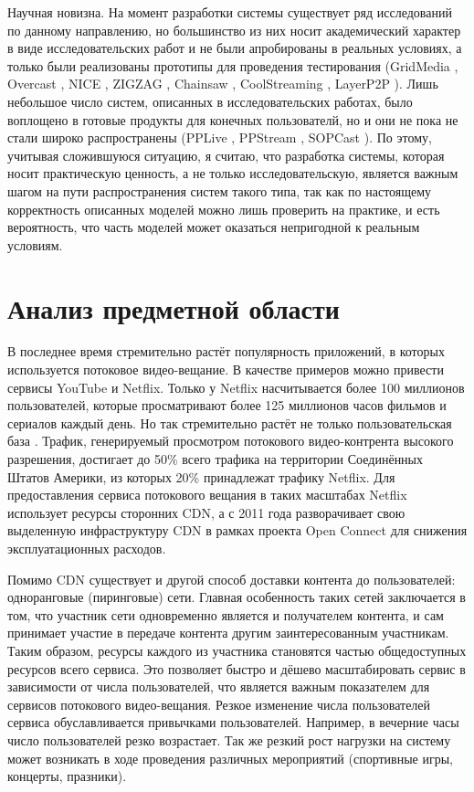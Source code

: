 	Научная новизна. На момент разработки системы существует ряд исследований по данному направлению, но
	большинство из них носит академический характер в виде исследовательских работ и не были апробированы в реальных
	условиях, а только были реализованы прототипы для проведения тестирования (GridMedia \cite{4013958}, Overcast
	\cite{1251243}, NICE \cite{633045}, ZIGZAG \cite{2314951}, Chainsaw \cite{2138975}, CoolStreaming \cite{878473483},
	LayerP2P \cite{5208239}). Лишь небольшое число систем, описанных в исследовательских работах, было воплощено в
	готовые продукты для конечных пользователй, но и они не пока не стали широко распространены (PPLive \cite{1403001},
	PPStream \cite{4685232}, SOPCast \cite{4346415}). По этому, учитывая сложившуюся ситуацию, я
	считаю, что разработка системы, которая носит практическую ценность, а не только исследовательскую, является важным
	шагом на пути распространения систем такого типа, так как по настоящему корректность описанных моделей можно лишь
	проверить на практике, и есть вероятность, что часть моделей может оказаться непригодной к реальным условиям.

\section{Анализ предметной области}

	В последнее время стремительно растёт популярность приложений, в которых используется потоковое видео-вещание.
	В качестве примеров можно привести сервисы YouTube и Netflix. Только у Netflix насчитывается более 100 миллионов
	пользователей, которые просматривают более 125 миллионов часов фильмов и сериалов каждый день. Но так стремительно
	растёт не только пользовательская база \cite{4454567}. Трафик, генерируемый просмотром потокового видео-контрента высокого
	разрешения, достигает до 50\% всего трафика на территории Соединённых Штатов Америки, из которых 20\% принадлежат
	трафику Netflix. Для предоставления сервиса потокового вещания в таких масштабах Netflix использует ресурсы
	сторонних CDN, а с 2011 года разворачивает свою выделенную инфраструктуру CDN в рамках проекта Open Connect для
	снижения эксплуатационных расходов.

	Помимо CDN существует и другой способ доставки контента до пользователей: одноранговые (пиринговые) сети.
	Главная особенность таких сетей заключается в том, что участник сети одновременно является и получателем контента,
	и сам принимает участие в передаче контента другим заинтересованным участникам. Таким образом, ресурсы каждого из
	участника становятся частью общедоступных ресурсов всего сервиса. Это позволяет быстро и дёшево масштабировать
	сервис в зависимости от числа пользователей, что является важным показателем для сервисов потокового видео-вещания.
	Резкое изменение числа пользователей сервиса обуславливается привычками пользователей. Например, в вечерние часы
	число пользователей резко возрастает. Так же резкий рост нагрузки на систему может возникать в ходе проведения
	различных мероприятий (спортивные игры, концерты, празники).


